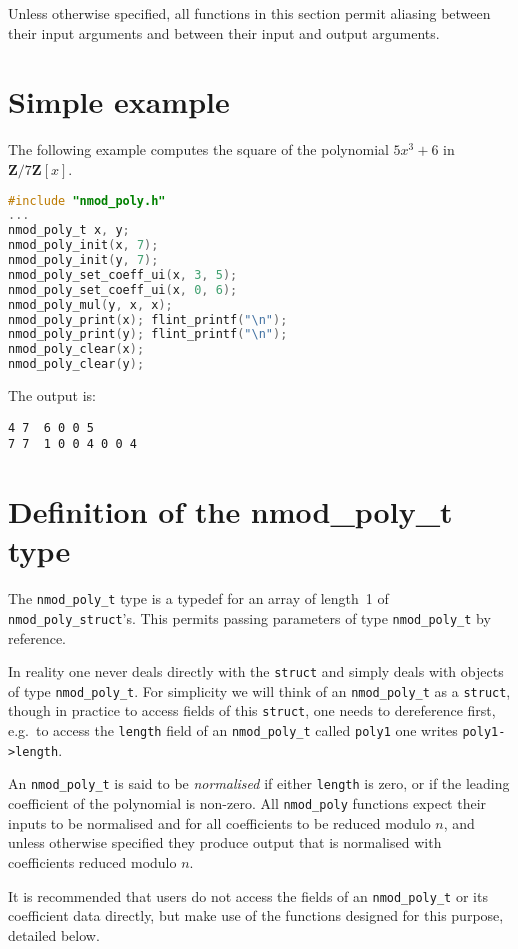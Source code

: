 \documentclass[a4paper,10pt]{book}
\newcommand{\Z}{\mathbf{Z}}%
\newcommand{\code}{\lstinline}
\begin{document}
{{Unless otherwise specified, all functions in this section permit aliasing
between their input arguments and between their input and output arguments.

\section{Simple example}

The following example computes the square of the polynomial $5x^3 + 6$
in $\Z/7\Z[x]$.
\begin{lstlisting}[language=c]
#include "nmod_poly.h"
...
nmod_poly_t x, y;
nmod_poly_init(x, 7);
nmod_poly_init(y, 7);
nmod_poly_set_coeff_ui(x, 3, 5);
nmod_poly_set_coeff_ui(x, 0, 6);
nmod_poly_mul(y, x, x);
nmod_poly_print(x); flint_printf("\n");
nmod_poly_print(y); flint_printf("\n");
nmod_poly_clear(x);
nmod_poly_clear(y);
\end{lstlisting}

The output is:
\begin{lstlisting}
4 7  6 0 0 5
7 7  1 0 0 4 0 0 4
\end{lstlisting}

\section{Definition of the nmod\_poly\_t type}

The \code{nmod_poly_t} type is a typedef for an array of length~1 of
\code{nmod_poly_struct}'s.  This permits passing parameters of type
\code{nmod_poly_t} by reference.

In reality one never deals directly with the \code{struct} and simply deals
with objects of type \code{nmod_poly_t}.  For simplicity we will think of an
\code{nmod_poly_t} as a \code{struct}, though in practice to access fields
of this \code{struct}, one needs to dereference first, e.g.\ to access the
\code{length} field of an \code{nmod_poly_t} called \code{poly1} one writes
\code{poly1->length}.

An \code{nmod_poly_t} is said to be \emph{normalised} if either
\code{length} is zero, or if the leading coefficient of the polynomial is
non-zero.  All \code{nmod_poly} functions expect their inputs to be
normalised and for all coefficients to be reduced modulo $n$, and unless
otherwise specified they produce output that is normalised with
coefficients reduced modulo $n$.

It is recommended that users do not access the fields of an
\code{nmod_poly_t} or its coefficient data directly, but make use of the
functions designed for this purpose, detailed below.

}}
\end{document}

